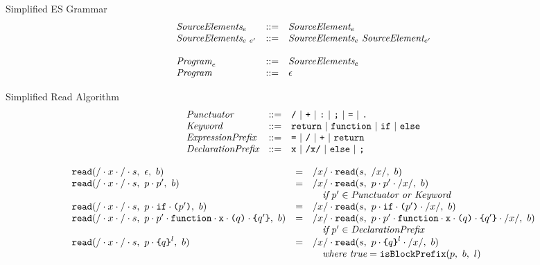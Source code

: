 \documentclass[preprint,10pt]{sigplanconf}
\begin{document}
\begin{displayfigure*}{\label{fig:grammar}Simplified ES Grammar}
\[\begin{array}{lcl}
  \textit{SourceElements}_{e} &::=& \textit{SourceElement}_{e}
  \\
  \textit{SourceElements}_{e~e'} &::=& \textit{SourceElements}_{e}~\textit{SourceElement}_{e'}
  \\ \\
  \textit{Program}_{e} &::=& \textit{SourceElements}_{e}
  \\
  \textit{Program}_{} &::=& \epsilon
\end{array}
\]  
\end{displayfigure*}



\begin{displayfigure*}{\label{fig:simpleread}Simplified Read Algorithm}
\[
\begin{array}{lcl}
  \textit{Punctuator} &::=& \texttt{/} ~|~ \texttt{+} ~|~ \texttt{:} ~|~
  \texttt{;} ~|~ \texttt{=} ~|~ \texttt{.}
  \\
  \textit{Keyword} &::=& \texttt{return} ~|~ \texttt{function}~|~
  \texttt{if} ~|~ \texttt{else}
  \\
  \textit{ExpressionPrefix} &::=& \texttt{=} ~|~ \texttt{/} ~|~ \texttt{+}
  ~|~ \texttt{return}
  \\
  \textit{DeclarationPrefix} &::=& 
   \texttt{x} ~|~ \texttt{/x/} ~|~ \texttt{else} ~|~ \texttt{;}
\end{array}
\]
  
\[
  \begin{array}{lcll}
    \texttt{read}(/\cdot x \cdot /\cdot s,~\epsilon,~b)
    &=&
    /x/ \cdot 
      \texttt{read}(s,~/x/,~b)
   
    \\
    \texttt{read}(/\cdot x \cdot /\cdot s,~p \cdot p',~b)
    &=&
    /x/ \cdot 
      \texttt{read}(s,~
        p \cdot p' \cdot /x/
      ,~b)
   
    \\
    && \quad\textit{if}~p' \in \textit{Punctuator or Keyword}
    \\
    \texttt{read}(/\cdot x \cdot /\cdot s,~
      p \cdot \texttt{if} \cdot \texttt{(}p'\texttt{)}
    ,~b)
    &=&
    /x/ \cdot 
      \texttt{read}(s,~p \cdot \texttt{if} \cdot \texttt{(}p'\texttt{)} \cdot /x/,~b)
   
    \\
    \texttt{read}(/\cdot x \cdot /\cdot s,~
      p \cdot p' \cdot \texttt{function} \cdot \texttt{x} 
      \cdot \texttt{(}q\texttt{)} \cdot \texttt{\{}q'\texttt{\}}
    ,~b)
    &=&
    /x/ \cdot 
      \texttt{read}(s,~
      p \cdot p' 
      \cdot \texttt{function} \cdot \texttt{x} \cdot 
      \texttt{(}q\texttt{)} \cdot \texttt{\{}q'\texttt{\}}\cdot /x/
      ,~b)
    \\
    && \quad \textit{if}~p' \in \textit{DeclarationPrefix}
    \\
    \texttt{read}(/\cdot x \cdot / \cdot s,~
      p \cdot \texttt{\{}q\texttt{\}}^{l}
    ,~b)
    &=&
    /x/ \cdot 
      \texttt{read}(s,~
        p \cdot \texttt{\{}q\texttt{\}}^{l}\cdot /x/
      ,~b)
   
    \\
    && \quad \textit{where true} = \texttt{isBlockPrefix}(p,~b,~l)


\end{array}\]
\end{displayfigure*}
\end{document}
